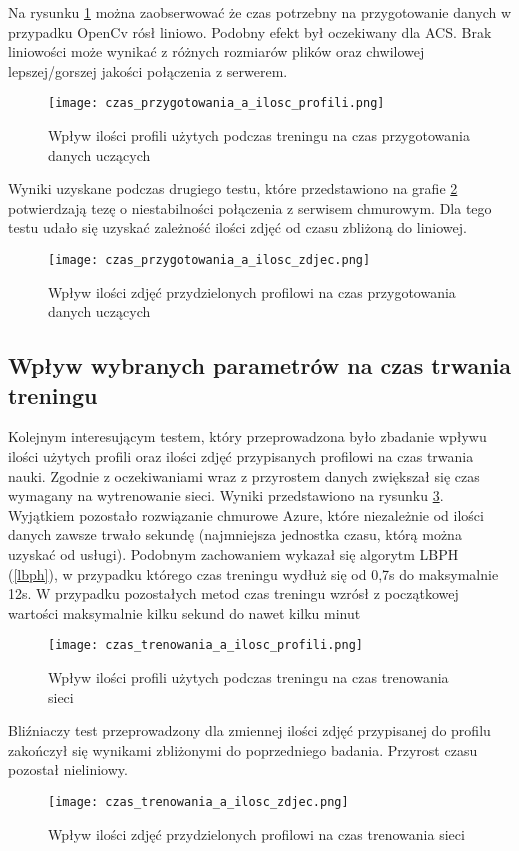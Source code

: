 Na rysunku \ref{fig:czas_p_profile} można zaobserwować że czas potrzebny na przygotowanie danych w przypadku OpenCv rósł liniowo. Podobny efekt był oczekiwany dla ACS. Brak liniowości może wynikać z różnych rozmiarów plików oraz chwilowej lepszej/gorszej jakości połączenia z serwerem.
\begin{figure}[H]
	\centering
	\texttt{[image: czas\_przygotowania\_a\_ilosc\_profili.png]}
	\caption{Wpływ ilości profili użytych podczas treningu na czas przygotowania danych uczących}
	\label{fig:czas_p_profile}
\end{figure}
Wyniki uzyskane podczas drugiego testu, które przedstawiono na grafie \ref{fig:czas_p_zdjecia} potwierdzają tezę o niestabilności połączenia z serwisem chmurowym. Dla tego testu udało się uzyskać zależność ilości zdjęć od czasu zbliżoną do liniowej.
\begin{figure}[H]
	\centering
	\texttt{[image: czas\_przygotowania\_a\_ilosc\_zdjec.png]}
	\caption{Wpływ ilości zdjęć przydzielonych profilowi na czas przygotowania danych uczących}
	\label{fig:czas_p_zdjecia}
\end{figure}

\subsection{Wpływ wybranych parametrów na czas trwania treningu}
Kolejnym interesującym testem, który przeprowadzona było zbadanie wpływu ilości użytych profili oraz ilości zdjęć przypisanych profilowi na czas trwania nauki. Zgodnie z oczekiwaniami wraz z przyrostem danych zwiększał się czas wymagany na wytrenowanie sieci. Wyniki przedstawiono na rysunku \ref{fig:czas_t_profile}. Wyjątkiem pozostało rozwiązanie chmurowe Azure, które niezależnie od ilości danych zawsze trwało sekundę (najmniejsza jednostka czasu, którą można uzyskać od usługi). Podobnym zachowaniem wykazał się algorytm LBPH (\ref{lbph}), w przypadku którego czas treningu wydłuż się od 0,7s do maksymalnie 12s. W przypadku pozostałych metod czas treningu wzrósł z początkowej wartości maksymalnie kilku sekund do nawet kilku minut
\begin{figure}[H]
	\centering
	\texttt{[image: czas\_trenowania\_a\_ilosc\_profili.png]}
	\caption{Wpływ ilości profili użytych podczas treningu na czas trenowania sieci}
	\label{fig:czas_t_profile}
\end{figure}
Bliźniaczy test przeprowadzony dla zmiennej ilości zdjęć przypisanej do profilu zakończył się wynikami zbliżonymi do poprzedniego badania. Przyrost czasu pozostał nieliniowy.
\begin{figure}[H]
	\centering
	\texttt{[image: czas\_trenowania\_a\_ilosc\_zdjec.png]}
	\caption{Wpływ ilości zdjęć przydzielonych profilowi na czas trenowania sieci}
	\label{fig:czas_t_zdjecia}
\end{figure}

